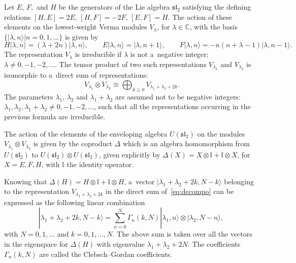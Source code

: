 \documentclass[10pt,a4paper]{amsart}
\numberwithin{equation}{section}
\theoremstyle{definition}
\begin{document}
Let $E$, $F,$ and $H$ be the generators of the Lie algebra $\mathfrak{sl}_2$ satisfying the defining relations
$
 [H,E]=2E$, $ [H,F]=-2F$, $ [E,F]=H$.
The action of these elements on the lowest-weight Verma modules $V_\lambda$, for $\lambda\in\mathbb{C}$, with the basis $\{|\lambda,n\rangle | n=0,1,\dots\}$ is given by
\[H|\lambda,n\rangle=(\lambda+2n)|\lambda,n\rangle, \qquad E|\lambda,n\rangle=|\lambda,n+1\rangle, \qquad F|\lambda,n\rangle=-n(n+\lambda-1)|\lambda,n-1\rangle.\]
The representation $V_\lambda$ is irreducible if $\lambda$ is not a~negative integer: $\lambda\neq 0,-1,-2,\dots$.
The tensor product of two such representations $V_{\lambda_1}$ and $V_{\lambda_2}$ is isomorphic to a~direct sum of representations:%
\begin{equation}
 \label{eq:decompo}
V_{\lambda_1}\otimes V_{\lambda_2} \cong \bigoplus_{k\geq 0} V_{\lambda_1+\lambda_2+2k}.
\end{equation}
The parameters $\lambda_1$, $\lambda_2$ and $\lambda_1+\lambda_2$ are assumed not to be negative integers: $\lambda_1, \lambda_2, \lambda_1+\lambda_2\neq 0,-1,-2,\dots$, such that all the representations occurring in the previous formula are irreducible.

The action of the elements of the enveloping algebra $U(\mathfrak{sl}_2)$ on the modules $V_{\lambda_1}\otimes V_{\lambda_2}$ is given by the coproduct $\Delta$ which is an algebra homomorphism from $U(\mathfrak{sl}_2)$ to $U(\mathfrak{sl}_2)\otimes U(\mathfrak{sl}_2)$, given explicitly by
$\Delta(X)=X\otimes \mathbb{I}+\mathbb{I}\otimes X$, for $ X=E,F,H$,
with $\mathbb{I}$ the identity operator.

Knowing that $\Delta(H)=H\otimes \mathbb{I}+\mathbb{I}\otimes H$, a~vector $|\lambda_1+\lambda_2+2k,N-k\rangle$ belonging to the representation $V_{\lambda_1+\lambda_2+2k}$ in the direct sum of~\eqref{eq:decompo} can be expressed as the following linear combination
\begin{equation}\label{eq:defCG}
|\lambda_1+\lambda_2+2k,N-k\rangle=\sum_{n=0}^N \Gamma_n(k,N) |\lambda_1,n\rangle\otimes |\lambda_2,N-n\rangle, \ \end{equation}
with $N=0,1,\dots$ and $k=0,1,\dots,N$.
The above sum is taken over all the vectors in the eigenspace for $\Delta(H)$ with eigenvalue $\lambda_1+\lambda_2+2N$.
The coefficients $\Gamma_n(k,N)$ are called the Clebsch--Gordan coefficients.
\end{document}
